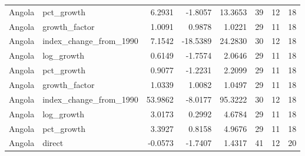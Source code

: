 \begin{table}
\begin{tabular}[t]{llrrrrrr}
Angola & pct\_growth & 6.2931 & -1.8057 & 13.3653 & 39 & 12 & 18\\
Angola & growth\_factor & 1.0091 & 0.9878 & 1.0221 & 29 & 11 & 18\\
\addlinespace
Angola & index\_change\_from\_1990 & 7.1542 & -18.5389 & 24.2830 & 30 & 12 & 18\\
Angola & log\_growth & 0.6149 & -1.7574 & 2.0646 & 29 & 11 & 18\\
Angola & pct\_growth & 0.9077 & -1.2231 & 2.2099 & 29 & 11 & 18\\
Angola & growth\_factor & 1.0339 & 1.0082 & 1.0497 & 29 & 11 & 18\\
Angola & index\_change\_from\_1990 & 53.9862 & -8.0177 & 95.3222 & 30 & 12 & 18\\
\addlinespace
Angola & log\_growth & 3.0173 & 0.2992 & 4.6784 & 29 & 11 & 18\\
Angola & pct\_growth & 3.3927 & 0.8158 & 4.9676 & 29 & 11 & 18\\
Angola & direct & -0.0573 & -1.7407 & 1.4317 & 41 & 12 & 20\\
\bottomrule
\end{tabular}
\end{table}